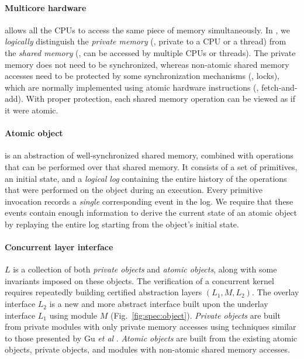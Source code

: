 \vspace*{-3pt}
\paragraph{Multicore hardware} allows
all the CPUs to access the same piece of memory
simultaneously.
In {\CTOS}, we \emph{logically} distinguish the \emph{private memory} 
(\ie, private to a CPU or a thread) from the \emph{shared memory} 
(\ie, can be accessed by multiple CPUs or threads). 
The private memory does not
need to be synchronized, whereas non-atomic
shared memory accesses need to be protected by some synchronization mechanisms
(\eg, locks), which are normally implemented using atomic hardware instructions
(\eg, fetch-and-add). With proper protection,
each shared memory operation can be viewed as if it were atomic.

\vspace*{-3pt}
\paragraph{Atomic object}

is an abstraction of well-synchronized shared memory, combined
with operations that can be performed over that shared memory.
It consists of a set of
primitives, an initial state, and a \emph{logical log} containing the entire
history of the operations that were performed on the object during
an execution. Every primitive invocation
records a \emph{single} corresponding event in the log. 
We require that these events contain enough information to derive the
current state of an atomic object by replaying the entire log starting 
from the object's initial state.

\vspace*{-3pt}
\paragraph{Concurrent layer interface}
$L$ is a collection of both \emph{private objects} and \emph{atomic objects},
along with some invariants imposed on these objects.
The verification of a concurrent kernel 
requires repeatedly 
building certified abstraction layers $(L_1, M, L_2)$.
The overlay interface $L_2$ is a
new and more abstract interface
built upon the underlay interface $L_1$ using module $M$
 (\cf Fig.~\ref{fig:spec:object}).
\emph{Private objects} are built from private modules with 
only private memory accesses
using techniques similar to those presented by Gu {\it et al} \cite{dscal15}. 
\emph{Atomic objects} are built from the 
existing atomic objects, private objects,
and modules with non-atomic shared memory accesses.

